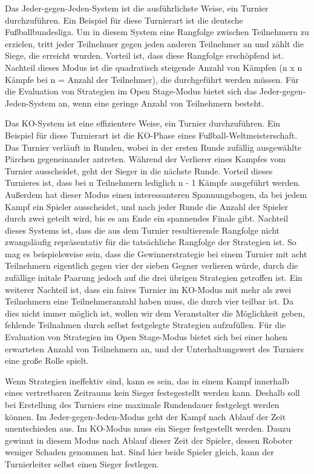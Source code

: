 Das Jeder-gegen-Jeden-System ist die ausführlichste Weise, ein Turnier durchzuführen. Ein Beispiel
für diese Turnierart ist die deutsche Fußballbundesliga. Um in diesem System eine Rangfolge zwischen
Teilnehmern zu erzielen, tritt jeder Teilnehmer gegen jeden anderen Teilnehmer an und zählt die
Siege, die erreicht wurden. Vorteil ist, dass diese Rangfolge erschöpfend ist. Nachteil dieses
Modus ist die quadratisch steigende Anzahl von Kämpfen (n x n Kämpfe bei n = Anzahl der Teilnehmer),
die durchgeführt werden müssen. Für die Evaluation von Strategien im Open Stage-Modus bietet sich das
Jeder-gegen-Jeden-System an, wenn eine geringe Anzahl von Teilnehmern besteht.

Das KO-System ist eine effizientere Weise, ein Turnier durchzuführen. Ein Beispiel für diese
Turnierart ist die KO-Phase eines Fußball-Weltmeisterschaft. Das Turnier verläuft in Runden, wobei
in der ersten Runde zufällig ausgewählte Pärchen gegeneinander antreten. Während der Verlierer eines
Kampfes vom Turnier ausscheidet, geht der Sieger in die nächste Runde. Vorteil dieses Turnieres ist,
dass bei n Teilnehmern lediglich n - 1 Kämpfe ausgeführt werden. Außerdem hat dieser Modus einen
interessanteren Spannungsbogen, da bei jedem Kampf ein Spieler ausscheidet, und nach jeder Runde die
Anzahl der Spieler durch zwei geteilt wird, bis es am Ende ein spannendes Finale gibt. Nachteil
dieses Systems ist, dass die aus dem Turnier resultierende Rangfolge nicht zwangsläufig
repräsentativ für die tatsächliche Rangfolge der Strategien ist. So mag es beispielsweise sein, dass
die Gewinnerstrategie bei einem Turnier mit acht Teilnehmern eigentlich gegen vier der sieben Gegner
verlieren würde, durch die zufällige initale Paarung jedoch auf die drei übrigen Strategien
getroffen ist. Ein weiterer Nachteil ist, dass ein faires Turnier im KO-Modus mit mehr als zwei
Teilnehmern eine Teilnehmeranzahl haben muss, die durch vier teilbar ist. Da dies nicht immer
möglich ist, wollen wir dem Veranstalter die Möglichkeit geben, fehlende Teilnahmen durch selbst
festgelegte Strategien aufzufüllen. Für die Evaluation von Strategien im Open Stage-Modus bietet
sich bei einer hohen erwarteten Anzahl von Teilnehmern an, und der Unterhaltungswert des Turniers
eine große Rolle spielt. 

Wenn Strategien ineffektiv sind, kann es sein, das in einem Kampf innerhalb eines vertretbaren
Zeitraums kein Sieger festegestellt werden kann. Deshalb soll bei Erstellung des Turniers eine
maximale Rundendauer festgelegt werden können. Im Jeder-gegen-Jeden-Modus geht der Kampf nach Ablauf
der Zeit unentschieden aus. Im KO-Modus muss ein Sieger festgestellt werden. Dauzu gewinnt in
diesem Modus nach Ablauf dieser Zeit der Spieler, dessen Roboter weniger Schaden genommen hat. Sind
hier beide Spieler gleich, kann der Turnierleiter selbst einen Sieger festlegen.

